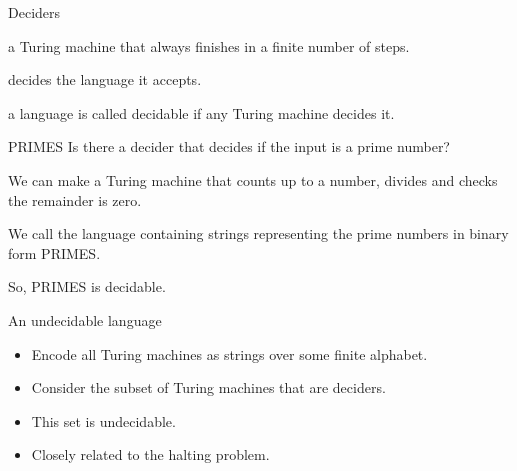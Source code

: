 \begin{frame}{Deciders}
  \vspace{2mm}
  \begin{description}
    \setlength\itemsep{6mm}
    \item[Decider:] a Turing machine that always finishes in a finite number of steps.
    \item[Decides:] decides the language it accepts.
    \item[Decidable:] a language is called decidable if any Turing machine decides it.
  \end{description}
  \vspace{2mm}
\end{frame}



\begin{frame}{PRIMES}
  Is there a decider that decides if the input is a prime number?


  We can make a Turing machine that counts up to a number, divides and checks the remainder is zero.

  \vspace{2mm}

  We call the language containing strings representing the prime numbers in binary form PRIMES.


  So, PRIMES is decidable.
\end{frame}



\begin{frame}{An undecidable language}
  
  \begin{itemize}
    \setlength\itemsep{6mm}
    \item Encode all Turing machines as strings over some finite alphabet.
    \item Consider the subset of Turing machines that are deciders.
    \item This set is undecidable.
    \item Closely related to the halting problem.
  \end{itemize}

\end{frame}